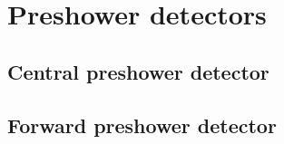 

\section{Preshower detectors}
\subsection{Central preshower detector}
\subsection{Forward preshower detector}

